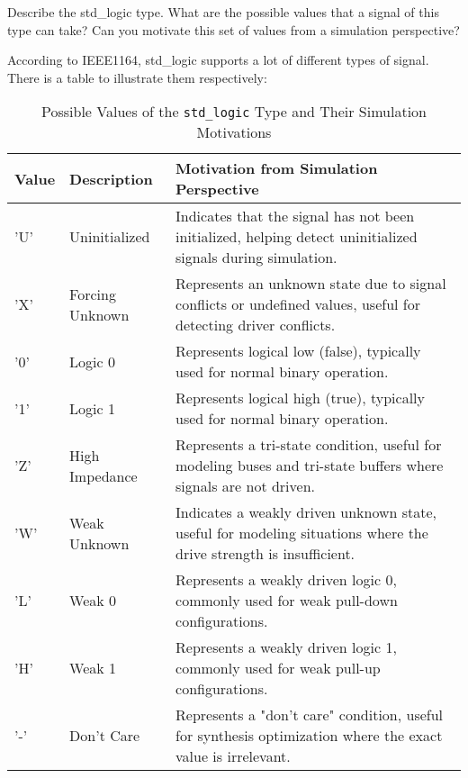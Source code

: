 \documentclass[12pt]{article}
\begin{document}
\begin{questionbox}
Describe the std\_logic type.
What are the possible values that a signal of this type can take?
Can you motivate this set of values from a simulation perspective?
\end{questionbox}

According to IEEE1164, std\_logic supports a lot of different types of signal.
There is a table to illustrate them respectively:

\newpage

\begin{table}[htbp]
\centering
\begin{tabular}{|>{\raggedright\arraybackslash}p{1.5cm}|>{\raggedright\arraybackslash}p{3.5cm}|>{\raggedright\arraybackslash}p{7cm}|}
\hline
\textbf{Value} & \textbf{Description} & \textbf{Motivation from Simulation Perspective} \\
\hline
'U' & Uninitialized & Indicates that the signal has not been initialized, helping detect uninitialized signals during simulation. \\
\hline
'X' & Forcing Unknown & Represents an unknown state due to signal conflicts or undefined values, useful for detecting driver conflicts. \\
\hline
'0' & Logic 0 & Represents logical low (false), typically used for normal binary operation. \\
\hline
'1' & Logic 1 & Represents logical high (true), typically used for normal binary operation. \\
\hline
'Z' & High Impedance & Represents a tri-state condition, useful for modeling buses and tri-state buffers where signals are not driven. \\
\hline
'W' & Weak Unknown & Indicates a weakly driven unknown state, useful for modeling situations where the drive strength is insufficient. \\
\hline
'L' & Weak 0 & Represents a weakly driven logic 0, commonly used for weak pull-down configurations. \\
\hline
'H' & Weak 1 & Represents a weakly driven logic 1, commonly used for weak pull-up configurations. \\
\hline
'-' & Don't Care & Represents a "don't care" condition, useful for synthesis optimization where the exact value is irrelevant. \\
\hline
\end{tabular}
\caption{Possible Values of the \texttt{std\_logic} Type and Their Simulation Motivations}\label{tab:std_type_table}
\end{table}
\end{document}
